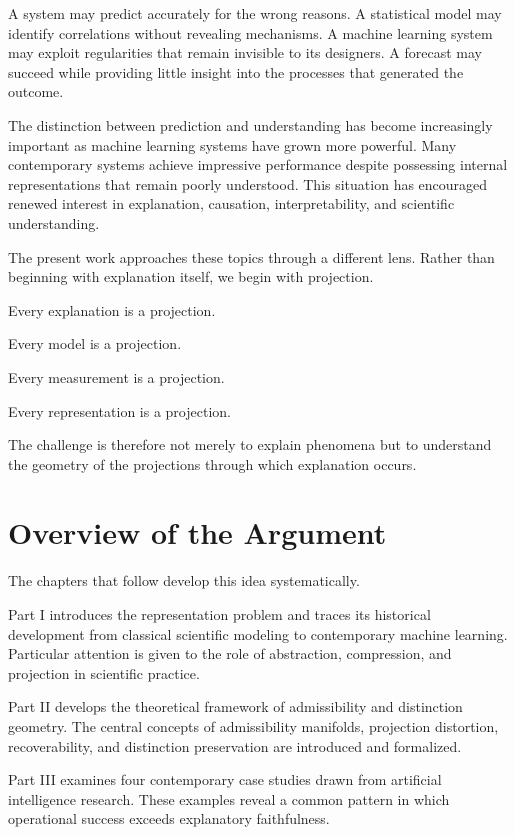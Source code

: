 \documentclass[11pt,oneside,openany]{book}
\begin{document}
A system may predict accurately for the wrong reasons. A statistical model may identify correlations without revealing mechanisms. A machine learning system may exploit regularities that remain invisible to its designers. A forecast may succeed while providing little insight into the processes that generated the outcome.

The distinction between prediction and understanding has become increasingly important as machine learning systems have grown more powerful. Many contemporary systems achieve impressive performance despite possessing internal representations that remain poorly understood. This situation has encouraged renewed interest in explanation, causation, interpretability, and scientific understanding.

The present work approaches these topics through a different lens. Rather than beginning with explanation itself, we begin with projection.

Every explanation is a projection.

Every model is a projection.

Every measurement is a projection.

Every representation is a projection.

The challenge is therefore not merely to explain phenomena but to understand the geometry of the projections through which explanation occurs.

\section{Overview of the Argument}

The chapters that follow develop this idea systematically.

Part I introduces the representation problem and traces its historical development from classical scientific modeling to contemporary machine learning. Particular attention is given to the role of abstraction, compression, and projection in scientific practice.

Part II develops the theoretical framework of admissibility and distinction geometry. The central concepts of admissibility manifolds, projection distortion, recoverability, and distinction preservation are introduced and formalized.

Part III examines four contemporary case studies drawn from artificial intelligence research. These examples reveal a common pattern in which operational success exceeds explanatory faithfulness.
\end{document}
